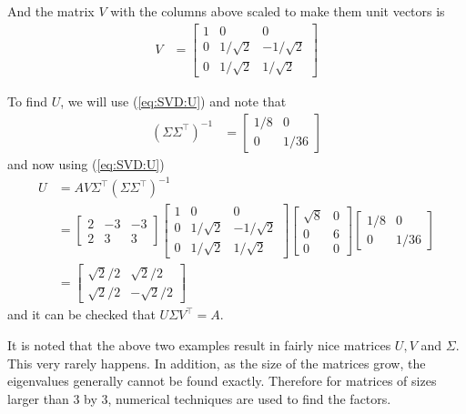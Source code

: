 \begin{example}
And the matrix $V$ with the columns above scaled to make them unit vectors is
\begin{align*}
V & = \begin{bmatrix}
1 & 0 & 0 \\
0 & 1/\sqrt{2} & -1/\sqrt{2} \\
0 & 1/\sqrt{2} & 1/\sqrt{2}
\end{bmatrix}
\end{align*}

To find $U$, we will use (\ref{eq:SVD:U}) and note that
\begin{align*}
(\Sigma \Sigma^{\intercal})^{-1} & = \begin{bmatrix}
1/8 & 0 \\
0 & 1/36
\end{bmatrix}
\end{align*}
and now using (\ref{eq:SVD:U})
\begin{align*}
U & = A V \Sigma^{\intercal} (\Sigma \Sigma^{\intercal})^{-1}  \\
& = \begin{bmatrix}
2 & -3 & -3 \\
2 & 3 & 3
\end{bmatrix} \begin{bmatrix}
1 & 0 & 0 \\
0 & 1/\sqrt{2} & -1/\sqrt{2} \\
0 & 1/\sqrt{2} & 1/\sqrt{2}
\end{bmatrix}\begin{bmatrix}
\sqrt{8} & 0  \\
0 & 6 \\
0 & 0 
\end{bmatrix}\begin{bmatrix}
1/8 & 0 \\
0 & 1/36 
\end{bmatrix} \\
& = \begin{bmatrix}
\sqrt{2}/2 & \sqrt{2}/2 \\
\sqrt{2}/2 & -\sqrt{2}/2
\end{bmatrix}
\end{align*}
%
and it can be checked that $U\Sigma V^{\intercal} = A$.  

\end{example}

It is noted that the above two examples result in fairly nice matrices $U,V$ and $\Sigma$.  This very rarely happens.  In addition, as the size of the matrices grow, the eigenvalues generally cannot be found exactly.  Therefore for matrices of sizes larger than 3 by 3, numerical techniques are used to find the factors.  

